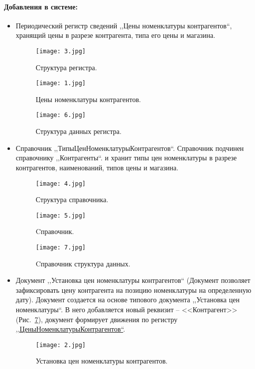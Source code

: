 \paragraph{Добавления в системе:}
\begin{itemize}	
	\item \label{l1}Периодический регистр сведений ,,Цены номенклатуры контрагентов``, хранящий цены в разрезе контрагента, типа его цены  и магазина.
	\begin{figure}[H]
		\texttt{[image: 3.jpg]}
		\caption{Структура регистра.}
		\label{ris:3.jpg}
	\end{figure}
	\begin{figure}[H]
		\texttt{[image: 1.jpg]}
		\caption{Цены номенклатуры контрагентов.}
		\label{ris:1.jpg}
	\end{figure}
	\begin{figure}[H]
		\texttt{[image: 6.jpg]}
		\caption{Структура данных регистра.}
		\label{ris:6.jpg}
	\end{figure}
	\item Справочник ,,ТипыЦенНоменклатурыКонтрагентов``. Справочник подчинен справочнику ,,Контрагенты``. и хранит типы цен номенклатуры в разрезе контрагентов, наименований, типов цены  и магазина. 
	\begin{figure}[H]
		\texttt{[image: 4.jpg]}
		\caption{Структура справочника.}
		\label{ris:4.jpg}
	\end{figure}
	\begin{figure}[H]
		\texttt{[image: 5.jpg]}
		\caption{Cправочник.}
		\label{ris:5.jpg}
	\end{figure}

	\begin{figure}[H]
		\texttt{[image: 7.jpg]}
		\caption{Cправочник структура данных.}
		\label{ris:7.jpg}
	\end{figure}
	\item Документ ,,Установка цен номенклатуры контрагентов`` (Документ позволяет зафиксировать цену контрагента на позицию номенклатуры на определенную дату). Документ создается на основе типового документа ,,Установка цен номенклатуры``. В него добавляется новый реквизит -- <<Контрагент>> 
	   (Рис.~\ref{ris:2.jpg}), документ формирует движения по регистру \hyperref[l1]{,,ЦеныНоменклатурыКонтрагентов``}. 
	
	\begin{figure}[H]
		\texttt{[image: 2.jpg]}
		\caption{Установка цен номенклатуры контрагентов.}
		\label{ris:2.jpg}
	\end{figure}
	
\end{itemize}
